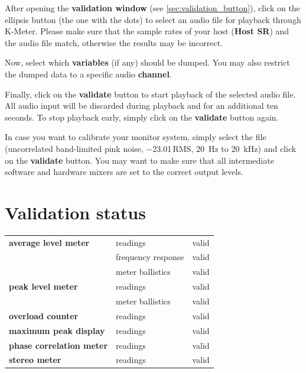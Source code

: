 After opening the \textbf{validation window} (see
\ref{sec:validation_button}), click on the ellipsis button (the one
with the dots) to select an audio file for playback through K-Meter.
Please make sure that the sample rates of your host (\textbf{Host SR})
and the audio file match, otherwise the results may be incorrect.

Now, select which \textbf{variables} (if any) should be dumped.  You
may also restrict the dumped data to a specific audio
\textbf{channel}.

Finally, click on the \textbf{validate} button to start playback of
the selected audio file.  All audio input will be discarded during
playback and for an additional ten seconds.  To stop playback early,
simply click on the \textbf{validate} button again.

In case you want to calibrate your monitor system, simply select the
file  (uncorrelated band-limited pink noise,
\SI{-23.01}{\dBFS}\,RMS, \SI{20}{\hertz} to \SI{20}{\kilo\hertz}) and
click on the \textbf{validate} button.  You may want to make sure that
all intermediate software and hardware mixers are set to the correct
output levels.

\section{Validation status}

\begin{minipage}{1.0\linewidth}
  \renewcommand{\thempfootnote}{\arabic{mpfootnote}}
  \begin{tabular}{>{\bfseries}lll}

    average level meter &
    readings &
    valid \\

    &
    frequency response &
    valid \\

    &
    meter ballistics &
    valid \\

    peak level meter &
    readings &
    valid \\

    &
    meter ballistics &
    valid \\

    overload counter &
    readings &
    valid \\

    maximum peak display &
    readings &
    valid \\

    phase correlation meter &
    readings &
    valid \\

    stereo meter &
    readings &
    valid \\

  \end{tabular}
\end{minipage}


